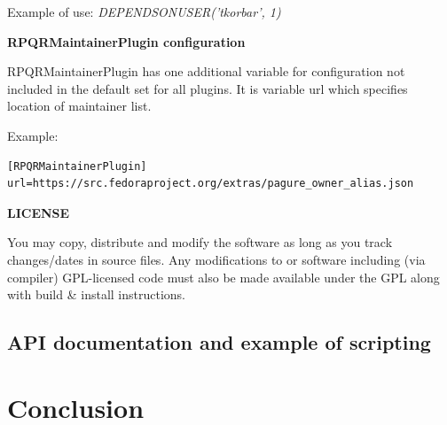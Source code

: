Example of use: \textit{DEPENDSONUSER('tkorbar', 1)}

\textbf{RPQRMaintainerPlugin configuration}

RPQRMaintainerPlugin has one additional variable for configuration not included in the default set for
all plugins. It is variable url which specifies location of maintainer list.

Example:
\begin{lstlisting}
[RPQRMaintainerPlugin]
url=https://src.fedoraproject.org/extras/pagure_owner_alias.json
\end{lstlisting}

\textbf{LICENSE}

You may copy, distribute and modify the software as long as you track changes/dates in source files.
Any modifications to or software including (via compiler) GPL-licensed code must also be made available
under the GPL along with build \& install instructions.

\section{API documentation and example of scripting}



\chapter{Conclusion}

\blindtext